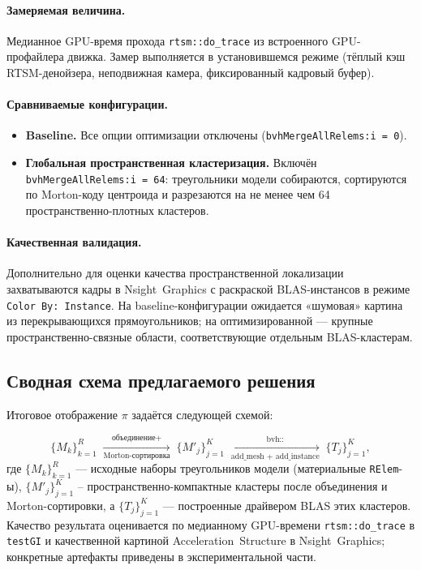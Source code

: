 \paragraph{Замеряемая величина.} Медианное GPU-время прохода
\texttt{rtsm::do\_trace} из встроенного GPU-профайлера движка.
Замер выполняется в установившемся режиме (тёплый кэш
RTSM-денойзера, неподвижная камера, фиксированный кадровый
буфер).

\paragraph{Сравниваемые конфигурации.}
\begin{itemize}
    \item \textbf{Baseline.} Все опции оптимизации отключены
      (\texttt{bvhMergeAllRelems:i = 0}).
    \item \textbf{Глобальная пространственная кластеризация.} Включён
      \texttt{bvhMergeAllRelems:i = 64}: треугольники модели
      собираются, сортируются по Morton-коду центроида и
      разрезаются на не менее чем 64 пространственно-плотных
      кластеров.
\end{itemize}

\paragraph{Качественная валидация.} Дополнительно для оценки
качества пространственной локализации захватываются кадры в
Nsight~Graphics с раскраской BLAS-инстансов в режиме
\texttt{Color By: Instance}. На baseline-конфигурации ожидается
«шумовая» картина из перекрывающихся прямоугольников; на
оптимизированной --- крупные пространственно-связные области,
соответствующие отдельным BLAS-кластерам.

\subsection{Сводная схема предлагаемого решения}

Итоговое отображение $\pi$ задаётся следующей схемой:

\begin{equation*}
\bigl\{M_k\bigr\}_{k=1}^{R}
\;\xrightarrow[\text{Morton-сортировка}]{\text{объединение} + }\;
\bigl\{M'_j\bigr\}_{j=1}^{K}
\;\xrightarrow[\text{add\_mesh + add\_instance}]{\text{bvh::}}\;
\bigl\{T_j\bigr\}_{j=1}^{K},
\end{equation*}
\noindent
где $\{M_k\}_{k=1}^{R}$ --- исходные наборы треугольников модели
(материальные \texttt{RElem}-ы), $\{M'_j\}_{j=1}^{K}$ --
пространственно-компактные кластеры после объединения и
Morton-сортировки, а $\{T_j\}_{j=1}^{K}$ --- построенные драйвером
BLAS этих кластеров. Качество результата оценивается по медианному
GPU-времени \texttt{rtsm::do\_trace} в \texttt{testGI}
и качественной картиной Acceleration~Structure в Nsight~Graphics;
конкретные артефакты приведены в экспериментальной части.

